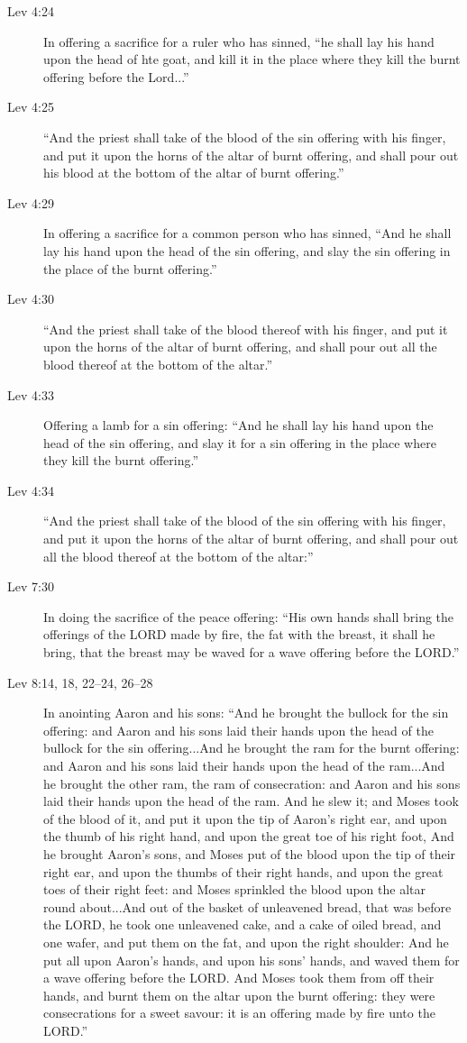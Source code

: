 \begin{description}
			\item[Lev 4:24] In offering a sacrifice for a ruler who has sinned, ``he shall lay his hand upon the head of hte goat, and kill it in the place where they kill the burnt offering before the Lord...''
			\item[Lev 4:25] ``And the priest shall take of the blood of the sin offering with his finger, and put it upon the horns of the altar of burnt offering, and shall pour out his blood at the bottom of the altar of burnt offering.''
			\item[Lev 4:29] In offering a sacrifice for a common person who has sinned, ``And he shall lay his hand upon the head of the sin offering, and slay the sin offering in the place of the burnt offering.''
			\item[Lev 4:30] ``And the priest shall take of the blood thereof with his finger, and put it upon the horns of the altar of burnt offering, and shall pour out all the blood thereof at the bottom of the altar.''
			\item[Lev 4:33] Offering a lamb for a sin offering: ``And he shall lay his hand upon the head of the sin offering, and slay it for a sin offering in the place where they kill the burnt offering.''
			\item[Lev 4:34] ``And the priest shall take of the blood of the sin offering with his finger, and put it upon the horns of the altar of burnt offering, and shall pour out all the blood thereof at the bottom of the altar:''
			\item[Lev 7:30] In doing the sacrifice of the peace offering: ``His own hands shall bring the offerings of the LORD made by fire, the fat with the breast, it shall he bring, that the breast may be waved for a wave offering before the LORD.''
			\item[Lev 8:14, 18, 22--24, 26--28] In anointing Aaron and his sons: ``And he brought the bullock for the sin offering: and Aaron and his sons laid their hands upon the head of the bullock for the sin offering...And he brought the ram for the burnt offering: and Aaron and his sons laid their hands upon the head of the ram...And he brought the other ram, the ram of consecration: and Aaron and his sons laid their hands upon the head of the ram. And he slew it; and Moses took of the blood of it, and put it upon the tip of Aaron's right ear, and upon the thumb of his right hand, and upon the great toe of his right foot, And he brought Aaron's sons, and Moses put of the blood upon the tip of their right ear, and upon the thumbs of their right hands, and upon the great toes of their right feet: and Moses sprinkled the blood upon the altar round about...And out of the basket of unleavened bread, that was before the LORD, he took one unleavened cake, and a cake of oiled bread, and one wafer, and put them on the fat, and upon the right shoulder: And he put all upon Aaron's hands, and upon his sons' hands, and waved them for a wave offering before the LORD. And Moses took them from off their hands, and burnt them on the altar upon the burnt offering: they were consecrations for a sweet savour: it is an offering made by fire unto the LORD.''

\end{description}
